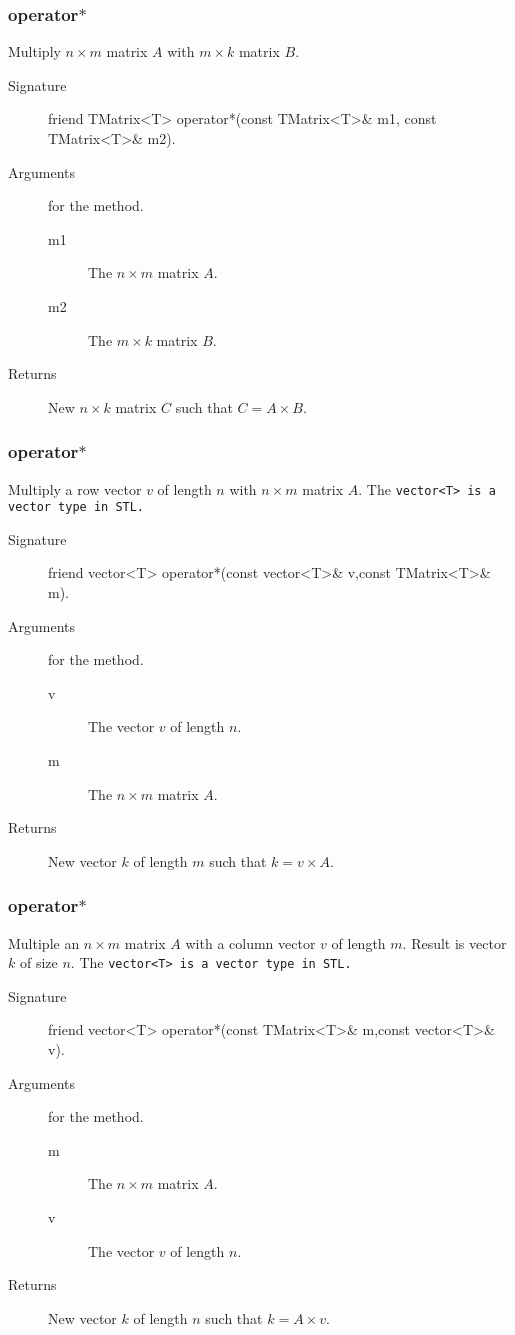 \subsubsection{operator$*$}
Multiply $n \times m$ matrix $A$ with $m \times k$ matrix $B$.
\begin{description} 
  \item[Signature] friend TMatrix<T> operator*(const TMatrix<T>\& m1,
  const TMatrix<T>\& m2).
  \item[Arguments] for the method.
    \begin{description}
      \item [m1] The  $n \times m$ matrix $A$.
      \item [m2] The  $m \times k$ matrix $B$.
    \end{description}
   \item [Returns] New $n \times k$ matrix $C$ such that $C = A \times B$.
\end{description}

\subsubsection{operator$*$}

Multiply a row vector $v$ of length $n$ with $n \times m$ matrix $A$.
The \tt vector<T> \rm is a vector type in STL.
\begin{description}
  \item[Signature] friend vector<T> operator*(const vector<T>\&
   v,const TMatrix<T>\& m).
  \item[Arguments] for the method.
   \begin{description}
     \item [v] The vector $v$ of length $n$.
     \item [m] The $n \times m$ matrix $A$.
   \end{description} 
  \item [Returns] New vector $k$ of length $m$ such that  $k = v \times A$.
\end{description} 


\subsubsection{operator$*$}
Multiple an $n \times m$ matrix $A$ with a column vector $v$ of length $m$. 
Result is vector $k$ of size $n$. The \tt vector<T> \rm is a vector 
type in STL.

\begin{description}
  \item[Signature] friend vector<T> operator*(const TMatrix<T>\& m,const vector<T>\& v).
  \item[Arguments] for the method.
   \begin{description}
     \item [m] The $n \times m$ matrix $A$.
     \item [v] The vector $v$ of length $n$.
   \end{description} 
  \item [Returns] New vector $k$ of length $n$ such that  $k = A \times v$.
\end{description}

